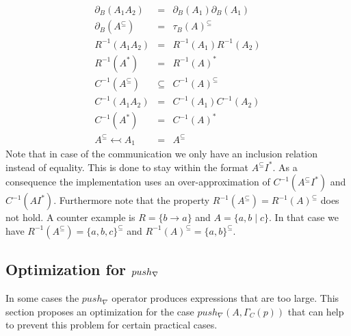 \documentclass{article}
\begin{document}
\[
\begin{array}{lll}
\partial _{B}\left( A_{1}A_{2}\right)  & = & \partial _{B}\left(
A_{1}\right) \partial _{B}\left( A_{1}\right)  \\ 
\partial _{B}\left( A^{\subseteq }\right)  & = & \tau _{B}(A)^{\subseteq }
\\ 
R^{-1}\left( A_{1}A_{2}\right)  & = & R^{-1}\left( A_{1}\right) R^{-1}\left(
A_{2}\right)  \\ 
R^{-1}\left( A^{\ast }\right)  & = & R^{-1}\left( A\right) ^{\ast } \\ 
C^{-1}\left( A^{\subseteq }\right)  & \subseteq  & C^{-1}\left( A\right)
^{\subseteq } \\ 
C^{-1}\left( A_{1}A_{2}\right)  & = & C^{-1}\left( A_{1}\right) C^{-1}\left(
A_{2}\right)  \\ 
C^{-1}\left( A^{\ast }\right)  & = & C^{-1}\left( A\right) ^{\ast } \\ 
A^{\subseteq }\leftarrowtail A_{1} & = & A^{\subseteq }%
\end{array}%
\]%
Note that in case of the communication we only have an inclusion relation
instead of equality. This is done to stay within the format $A^{\subseteq
}I^{\ast }$. As a consequence the implementation uses an over-approximation
of $C^{-1}\left( A^{\subseteq }I^{\ast }\right) $ and $C^{-1}\left( AI^{\ast
}\right) $. Furthermore note that the property $R^{-1}\left( A^{\subseteq
}\right) =R^{-1}\left( A\right) ^{\subseteq }$ does not hold. A counter
example is $R=\{b\rightarrow a\}$ and $A=\{a,b\mid c\}$. In that case we
have $R^{-1}\left( A^{\subseteq }\right) =\{a,b,c\}^{\subseteq }$ and $%
R^{-1}\left( A\right) ^{\subseteq }=\{a,b\}^{\subseteq }$.

\newpage

\subsection{Optimization for $push_{\protect\nabla }$}

In some cases the $push_{\nabla }$ operator produces expressions that are
too large. This section proposes an optimization for the case $push_{\nabla
}(A,\Gamma _{C}(p))$ that can help to prevent this problem for certain
practical cases.
\end{document}
